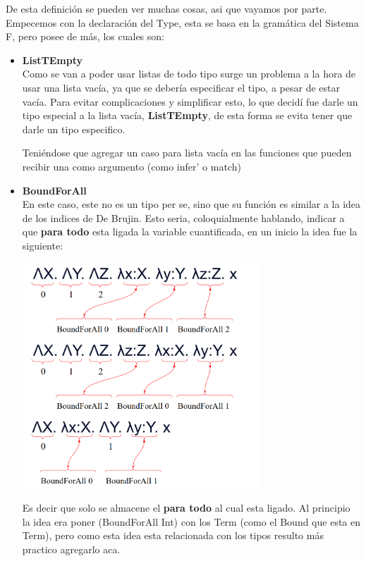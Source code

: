 \documentclass[12pt, titlepage, a4paper]{article}
\begin{document}
De esta definición se pueden ver muchas cosas, asi que vayamos por parte. Empecemos con la declaración del Type, esta se basa en la gramática del Sistema F, pero 
posee  de más, los cuales son: 

\begin{itemize}[label=$\bullet$]
  \item {\textbf{ListTEmpty}\\
  Como se van a poder usar listas de todo tipo surge un problema a la hora de usar una lista vacía, ya que se debería especificar el tipo, 
  a pesar de estar vacía. 
  Para evitar complicaciones y simplificar esto, lo que decidí fue darle un tipo especial a la lista vacía, \textbf{ListTEmpty}, de esta forma se evita 
  tener que darle un tipo especifico.
  
  Teniéndose que agregar un caso  para lista vacía en las funciones que pueden recibir una como argumento (como infer' o match)
  }

  \item {\textbf{BoundForAll}\\
  En este caso, este no es un tipo per se, sino que su función es similar a la idea 
  de los indices de De Brujin. Esto seria, coloquialmente hablando, indicar a que \textbf{para todo} esta ligada la variable cuantificada, 
  en un inicio la idea fue la siguiente:

  \begin{center}
      \includegraphics[width=0.7\textwidth]{Imagenes/EjemploBoundForAll.png}
  \end{center}

  Es decir que solo se almacene el \textbf{para todo} al cual esta ligado. 
  Al principio la idea era poner (BoundForAll Int) con los Term (como el Bound que esta en Term), pero como esta idea esta relacionada con 
  los tipos resulto más practico agregarlo aca.\\
  
}
\end{itemize}
\end{document}
